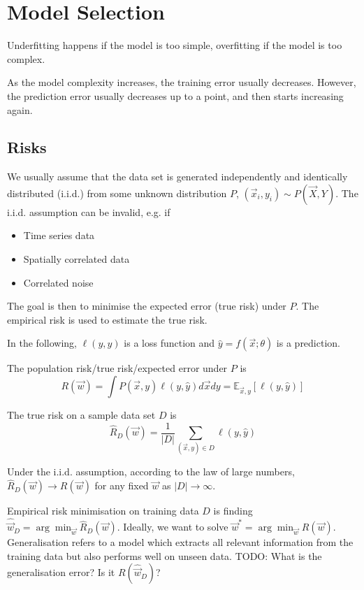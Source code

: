 \section{Model Selection}
Underfitting happens if the model is too
simple, overfitting if the model is too complex.

As the model complexity increases,
the training error usually decreases.
However, the prediction error usually
decreases up to a point, and then starts
increasing again.


\subsection{Risks}
We usually assume that the data set is generated
independently and identically distributed (i.i.d.)
from some unknown distribution $P$,
$(\vec{x}_i, y_i) \sim P(\vec{X}, Y)$.
The i.i.d. assumption can be invalid, e.g. if
\begin{itemize}
    \item Time series data
    \item Spatially correlated data
    \item Correlated noise
\end{itemize}
The goal is then to minimise the expected error
(true risk) under $P$.
The empirical risk is used to estimate the true risk.

In the following, $\ell(y, \hat{y})$ is a loss function
and $\hat{y} = f(\vec{x}; \theta)$ is a prediction.

The population risk/true risk/expected error under $P$ is
\begin{equation*}
    R(\vec{w})
    = \int{P(\vec{x}, y)\ell(y, \hat{y}) d\vec{x} dy}
    = \mathbb{E}_{\vec{x}, y}[\ell(y, \hat{y})]
\end{equation*}

The true risk on a sample data set $D$ is
\begin{equation*}
    \hat{R}_D(\vec{w}) = \frac{1}{|D|}
        \sum_{(\vec{x}, y) \in D}{\ell(y, \hat{y})}
\end{equation*}

Under the i.i.d. assumption,
according to the law of large numbers,
$\hat{R}_D(\vec{w}) \to R(\vec{w})$
for any fixed $\vec{w}$ as $|D| \to \infty$.

Empirical risk minimisation on training data $D$ is
finding
$\hat{\vec{w}}_D = \arg\min_{\vec{w}}{\hat{R}_D(\vec{w})}$.
Ideally, we want to solve
$\vec{w}^* = \arg\min_{\vec{w}}{R(\vec{w})}$.
Generalisation refers to a model which extracts
all relevant information from the training data
but also performs well on unseen data.
TODO: What is the generalisation error? Is it $R(\hat{\vec{w}}_D)$?

